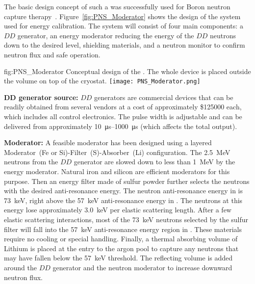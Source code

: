 The basic design concept of such a  was successfully used for Boron neutron capture therapy~\cite{bib:Koivunoro2004}. Figure~\ref{fig:PNS_Moderator} shows the design of the  system used for energy calibration. The system will consist of four main components: a $DD$  generator, an energy moderator reducing the energy of the $DD$ neutrons down to the desired level, shielding materials, and a neutron monitor to confirm neutron flux and safe operation. 

\begin{dunefigure}{fig:PNS_Moderator}
{Conceptual design of the . The whole device is placed outside the  volume on top of the cryostat.}
\texttt{[image: PNS\_Moderator.png]}
\end{dunefigure}



{\bf DD generator source:}  $DD$ generators are commercial devices that can be readily obtained from several vendors at a cost of approximately \$\num{125000} each, which includes all control electronics. The pulse width is adjustable and can be delivered from approximately \SIrange{10}{1000}{\micro\s} (which affects the total output). 

{\bf Moderator:}  A feasible moderator has been designed using a layered Moderator~(Fe or Si)-Filter~(S)-Absorber~(Li) %
configuration. The \SI{2.5}{\MeV} neutrons from the $DD$ generator are slowed down to less than \SI{1}{\MeV} by the energy moderator. Natural iron and silicon are efficient moderators for this purpose. Then an energy filter made of sulfur powder further selects the neutrons with the desired anti-resonance energy.
The neutron anti-resonance energy in  is \SI{73}{\keV}, right above the \SI{57}{\keV} anti-resonance energy in . The neutrons at this energy lose approximately \SI{3.0}{\keV} per elastic scattering length. After a few elastic scattering interactions, most of the \SI{73}{\keV} neutrons selected by the sulfur filter will fall into the \SI{57}{\keV} anti-resonance energy region in . These materials require no cooling or special handling. Finally, a thermal absorbing volume of Lithium is placed at the entry to the argon pool to capture any neutrons that may have fallen below the \SI{57}{\keV} threshold. The reflecting volume is added around the $DD$ generator and the neutron moderator to increase downward neutron flux. 

